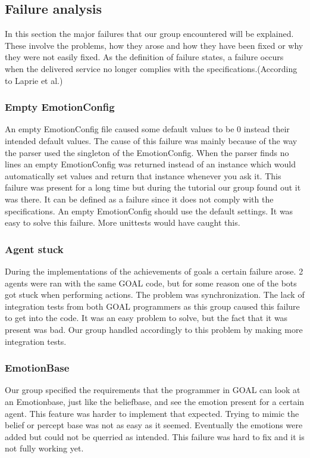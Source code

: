\documentclass[11pt]{article}
\begin{document}
\subsection{Failure analysis}
In this section the major failures that our group encountered will be explained. These involve the problems, how they arose and how they have been fixed or why they were not easily fixed. As the definition of failure states, a failure occurs when the delivered service no longer complies with the specifications.(According to Laprie et al.)\cite{failure}

\subsubsection*{Empty EmotionConfig}
An empty EmotionConfig file caused some default values to be 0 instead their intended default values. The cause of this failure was mainly because of the way the parser used the singleton of the EmotionConfig. When the parser finds no lines an empty EmotionConfig was returned instead of an instance which would automatically set values and return that instance whenever you ask it. This failure was present for a long time but during the tutorial our group found out it was there. It can be defined as a failure since it does not comply with the specifications. An empty EmotionConfig should use the default settings. It was easy to solve this failure. More unittests would have caught this.

\subsubsection*{Agent stuck}
During the implementations of the achievements of goals a certain failure arose. 2 agents were ran with the same GOAL code, but for some reason one of the bots got stuck when performing actions. The problem was synchronization. The lack of integration tests from both GOAL programmers as this group caused this failure to get into the code. It was an easy problem to solve, but the fact that it was present was bad. Our group handled accordingly to this problem by making  more integration tests. 

\subsubsection*{EmotionBase}
Our group specified the requirements that the programmer in GOAL can look at an Emotionbase, just like the beliefbase, and see the emotion present for a certain agent. This feature was harder to implement that expected. Trying to mimic the belief or percept base was not as easy as it seemed. Eventually the emotions were added but could not be querried as intended. This failure was hard to fix and it is not fully working yet. 
\end{document}
